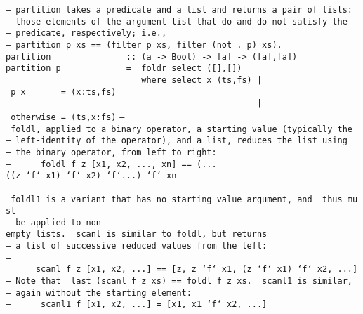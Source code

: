 %
\eprogB\noindent\bprogB
\mbox{\tt --\ partition\ takes\ a\ predicate\ and\ a\ list\ and\ returns\ a\ pair\ of\ lists:}\\
\mbox{\tt --\ those\ elements\ of\ the\ argument\ list\ that\ do\ and\ do\ not\ satisfy\ the}\\
\mbox{\tt --\ predicate,\ respectively;\ i.e.,}\\
\mbox{\tt --\ partition\ p\ xs\ ==\ (filter\ p\ xs,\ filter\ (not\ .\ p)\ xs).}\\
\mbox{\tt partition\ \ \ \ \ \ \ \ \ \ \ \ \ \ \ ::\ (a\ ->\ Bool)\ ->\ [a]\ ->\ ([a],[a])}\\
\mbox{\tt partition\ p\ \ \ \ \ \ \ \ \ \ \ \ \ =\ \ foldr\ select\ ([],[])}\\
\mbox{\tt \ \ \ \ \ \ \ \ \ \ \ \ \ \ \ \ \ \ \ \ \ \ \ \ \ \ \ where\ select\ x\ (ts,fs)\ |\ p\ x\ \ \ \ \ \ \ =\ (x:ts,fs)}\\
\mbox{\tt \ \ \ \ \ \ \ \ \ \ \ \ \ \ \ \ \ \ \ \ \ \ \ \ \ \ \ \ \ \ \ \ \ \ \ \ \ \ \ \ \ \ \ \ \ \ \ \ \ \ |\ otherwise\ =\ (ts,x:fs)}
%
\eprogB\noindent\bprogB
\mbox{\tt --\ foldl,\ applied\ to\ a\ binary\ operator,\ a\ starting\ value\ (typically\ the}\\
\mbox{\tt --\ left-identity\ of\ the\ operator),\ and\ a\ list,\ reduces\ the\ list\ using}\\
\mbox{\tt --\ the\ binary\ operator,\ from\ left\ to\ right:}\\
\mbox{\tt --\ \ \ \ \ \ foldl\ f\ z\ [x1,\ x2,\ ...,\ xn]\ ==\ (...((z\ `f`\ x1)\ `f`\ x2)\ `f`...)\ `f`\ xn}\\
\mbox{\tt --\ foldl1\ is\ a\ variant\ that\ has\ no\ starting\ value\ argument,\ and\ \ thus\ must}\\
\mbox{\tt --\ be\ applied\ to\ non-empty\ lists.\ \ scanl\ is\ similar\ to\ foldl,\ but\ returns}\\
\mbox{\tt --\ a\ list\ of\ successive\ reduced\ values\ from\ the\ left:}\\
\mbox{\tt --\ \ \ \ \ \ scanl\ f\ z\ [x1,\ x2,\ ...]\ ==\ [z,\ z\ `f`\ x1,\ (z\ `f`\ x1)\ `f`\ x2,\ ...]}\\
\mbox{\tt --\ Note\ that\ \ last\ (scanl\ f\ z\ xs)\ ==\ foldl\ f\ z\ xs.\ \ scanl1\ is\ similar,}\\
\mbox{\tt --\ again\ without\ the\ starting\ element:}\\
\mbox{\tt --\ \ \ \ \ \ scanl1\ f\ [x1,\ x2,\ ...]\ =\ [x1,\ x1\ `f`\ x2,\ ...]}\\
\mbox{\tt }\\[-8pt]
